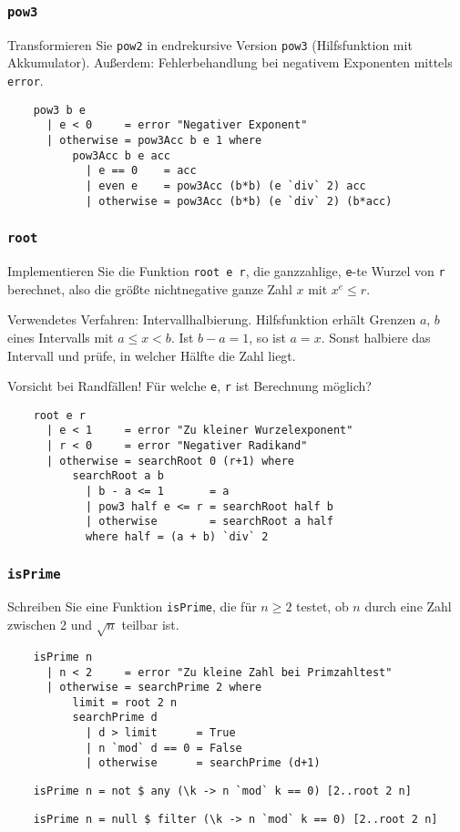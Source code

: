\documentclass{beamer}
\begin{document}
\begin{frame}[fragile]
  \frametitle{\lstinline{pow3}}
  Transformieren Sie \lstinline{pow2} in endrekursive Version \lstinline{pow3} (Hilfsfunktion mit Akkumulator).
  Außerdem: Fehlerbehandlung bei negativem Exponenten mittels \lstinline{error}.
  \pause
  \begin{lstlisting}
    pow3 b e
      | e < 0     = error "Negativer Exponent"
      | otherwise = pow3Acc b e 1 where
          pow3Acc b e acc
            | e == 0    = acc
            | even e    = pow3Acc (b*b) (e `div` 2) acc
            | otherwise = pow3Acc (b*b) (e `div` 2) (b*acc)
  \end{lstlisting}
\end{frame}

\begin{frame}[fragile]
  \frametitle{\lstinline{root}}
  Implementieren Sie die Funktion \lstinline{root e r}, die ganzzahlige, \lstinline{e}-te Wurzel von \lstinline{r} berechnet,
  also die größte nichtnegative ganze Zahl $x$ mit $x^e \leq r$.
  
  Verwendetes Verfahren: Intervallhalbierung.
  Hilfsfunktion erhält Grenzen $a$, $b$ eines Intervalls mit $a \leq x < b$.
  Ist $b-a=1$, so ist $a=x$.
  Sonst halbiere das Intervall und prüfe, in welcher Hälfte die Zahl liegt.
  
  Vorsicht bei Randfällen!
  Für welche \lstinline{e}, \lstinline{r} ist Berechnung möglich?
  \pause
  \begin{lstlisting}
    root e r
      | e < 1     = error "Zu kleiner Wurzelexponent"
      | r < 0     = error "Negativer Radikand"
      | otherwise = searchRoot 0 (r+1) where
          searchRoot a b
            | b - a <= 1       = a
            | pow3 half e <= r = searchRoot half b
            | otherwise        = searchRoot a half
            where half = (a + b) `div` 2
  \end{lstlisting}
\end{frame}

\begin{frame}[fragile]
  \frametitle{\lstinline{isPrime}}
  Schreiben Sie eine Funktion \lstinline{isPrime}, die für $n \geq 2$ testet, ob $n$ durch eine Zahl zwischen 2 und $\sqrt{n}$ teilbar ist.
  \pause
  \begin{lstlisting}
    isPrime n
      | n < 2     = error "Zu kleine Zahl bei Primzahltest"
      | otherwise = searchPrime 2 where
          limit = root 2 n
          searchPrime d
            | d > limit      = True
            | n `mod` d == 0 = False
            | otherwise      = searchPrime (d+1)
  \end{lstlisting}
  \pause
  \begin{lstlisting}
    isPrime n = not $ any (\k -> n `mod` k == 0) [2..root 2 n]
  \end{lstlisting}
  \pause
  \begin{lstlisting}
    isPrime n = null $ filter (\k -> n `mod` k == 0) [2..root 2 n]
  \end{lstlisting}
\end{frame}
\end{document}
